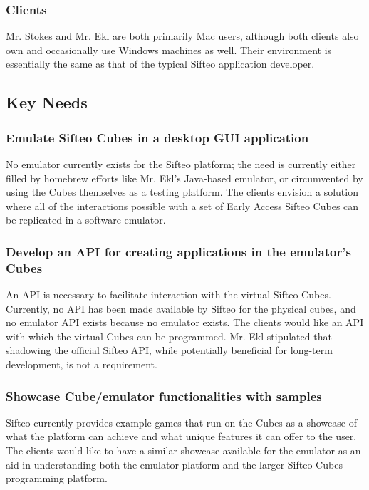 \documentclass[12pt]{article}
\begin{document}
                          \subsubsection{Clients}
			  Mr. Stokes and Mr. Ekl are both primarily \gls{Mac} users, although both clients also own and occasionally use \gls{Windows} machines as well. Their environment is essentially the same as that of the typical Sifteo application developer.

               \subsection{Key Needs}

                          \subsubsection{Emulate Sifteo Cubes in a desktop GUI application}
                          No emulator currently exists for the Sifteo platform; the need is currently either filled by homebrew efforts like Mr. Ekl's Java-based emulator, or circumvented by using the Cubes themselves as a testing platform. The clients envision a solution where all of the interactions possible with a set of Early Access Sifteo Cubes can be replicated in a software emulator.

                          \subsubsection{Develop an API for creating applications in the emulator’s Cubes}
                          An \gls{API} is necessary to facilitate interaction with the virtual Sifteo Cubes. Currently, no \gls{API} has been made available by Sifteo for the physical cubes, and no emulator \gls{API} exists because no emulator exists. The clients would like an \gls{API} with which the virtual Cubes can be programmed. Mr. Ekl stipulated that shadowing the official Sifteo \gls{API}, while potentially beneficial for long-term development, is not a requirement.

                          \subsubsection{Showcase Cube/emulator functionalities with samples}
                          Sifteo currently provides example games that run on the Cubes as a showcase of what the platform can achieve and what unique features it can offer to the user. The clients would like to have a similar showcase available for the emulator as an aid in understanding both the emulator platform and the larger Sifteo Cubes programming platform.
\end{document}
